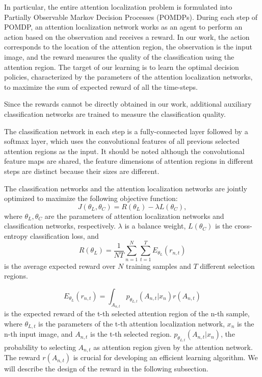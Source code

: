 \documentclass[10pt,twocolumn,letterpaper]{article}
\begin{document}
In particular, the entire attention localization problem is formulated into Partially Observable Markov Decision Processes (POMDPs).
During each step of POMDP, an attention localization network works as an agent to perform an action based on the observation and receives a reward.
In our work, the action corresponds to the location of the attention region, the observation is the input image, and the reward measures the quality of the classification using the attention region.
The target of our learning is to learn the optimal decision policies, characterized by the parameters of the attention localization networks, to maximize the sum of expected reward of all the time-steps.

Since the rewards cannot be directly obtained in our work, additional auxiliary classification networks are trained to measure the classification quality.

The classification network in each step is a fully-connected layer followed by a softmax layer, which uses the convolutional features of all previous selected attention regions as the input.
It should be noted although the convolutional feature maps are shared, the feature dimensions of attention regions in different steps are distinct because their sizes are different.

The classification networks and the attention localization networks are jointly optimized to maximize the following objective function:
\begin{equation}
J(\theta_L, \theta_C) =  R(\theta_L) - \lambda L(\theta_C),
\end{equation}
where $\theta_L, \theta_C$ are the parameters of attention localization networks and classification networks, respectively.  $\lambda$ is a balance weight,  $L(\theta_C)$ is the cross-entropy classification loss, and
\begin{equation}
R(\theta_L) = \frac{1}{NT}\sum_{n=1}^{N}\sum_{t=1}^T E_{\theta_L}(r_{n,t})
\end{equation}
is the average expected reward over $N$ training samples and $T$ different selection regions.

\begin{equation}
E_{\theta_L}(r_{n,t}) = \int_{A_{n,t}} p_{\theta_{L,t}}(A_{n,t}|x_n)r(A_{n,t})
\end{equation}
is the expected reward of the t-th selected attention region of the n-th sample,
where $\theta_{L,t}$ is the parameters of the t-th attention localization network,
$x_n$ is the n-th input image, and $A_{n,t}$ is the t-th selected region.
$p_{\theta_{L,t}}(A_{n,t}|x_n)$, the probability to selecting $A_{n,t}$ as attention region given by the attention network.
The reward $r(A_{n,t})$ is crucial for developing an efficient learning algorithm. We will describe the design of the reward in the following subsection.
\end{document}
